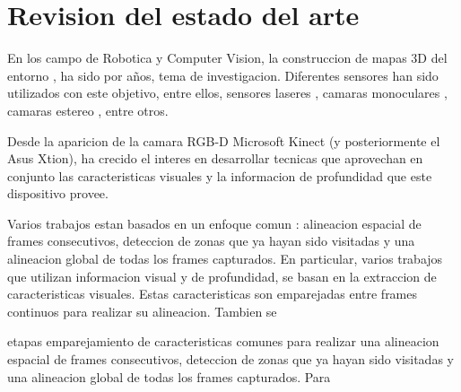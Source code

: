 \chapter{Revision del estado del arte}

En los campo de Robotica y Computer Vision, la construccion de mapas 3D del entorno 
, ha sido por años, tema de investigacion. Diferentes sensores han sido utilizados con este objetivo, entre ellos, sensores laseres \cite{chou2013robotic}\cite{Montemerlo02fastslam}, camaras monoculares \cite{tomono2009robust}\cite{clemente_etal_rss2007}, camaras estereo \cite{Mei11}\cite{Konolige08}, entre otros.

Desde la aparicion de la camara RGB-D Microsoft Kinect (y posteriormente el Asus Xtion), ha crecido el interes en desarrollar tecnicas que aprovechan en conjunto las caracteristicas visuales y la informacion de profundidad que este dispositivo provee. 

Varios trabajos estan basados en un enfoque comun : alineacion espacial de frames consecutivos, deteccion de zonas que ya hayan sido visitadas y una alineacion global de todas los frames capturados. En particular, varios trabajos que utilizan informacion visual y de profundidad, se basan en la extraccion de caracteristicas visuales. Estas caracteristicas son emparejadas entre frames continuos para realizar su alineacion.
Tambien se  

etapas emparejamiento de caracteristicas comunes para realizar una alineacion espacial de frames consecutivos, deteccion de zonas que ya hayan sido visitadas y una alineacion global de todas los frames capturados. Para 

\cite{engelhardreal}